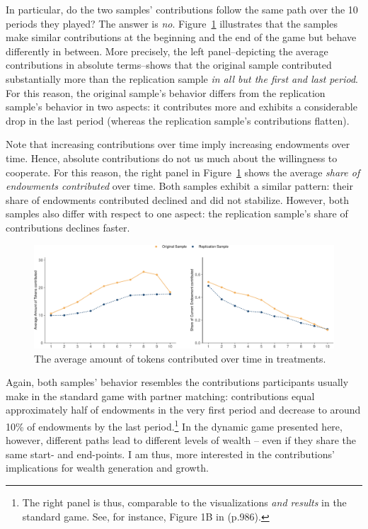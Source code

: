 \documentclass[
  authoryear,
  preprint,
  3p]{elsarticle}
\begin{document}
In particular, do the two samples' contributions follow the same path
over the 10 periods they played? The answer is \emph{no}.
Figure~\ref{fig-share-of-contributions} illustrates that the samples
make similar contributions at the beginning and the end of the game but
behave differently in between. More precisely, the left panel--depicting
the average contributions in absolute terms--shows that the original
sample contributed substantially more than the replication sample
\emph{in all but the first and last period}. For this reason, the
original sample's behavior differs from the replication sample's
behavior in two aspects: it contributes more and exhibits a considerable
drop in the last period (whereas the replication sample's contributions
flatten).

Note that increasing contributions over time imply increasing endowments
over time. Hence, absolute contributions do not us much about the
willingness to cooperate. For this reason, the right panel in
Figure~\ref{fig-share-of-contributions} shows the average \emph{share of
endowments contributed} over time. Both samples exhibit a similar
pattern: their share of endowments contributed declined and did not
stabilize. However, both samples also differ with respect to one aspect:
the replication sample's share of contributions declines faster.

\begin{figure}

{\centering \includegraphics{paper_files/figure-pdf/fig-share-of-contributions-1.pdf}

}

\caption{\label{fig-share-of-contributions}The average amount of tokens
contributed over time in treatments.}

\end{figure}

Again, both samples' behavior resembles the contributions participants
usually make in the standard game with partner matching: contributions
equal approximately half of endowments in the very first period and
decrease to around 10\% of endowments by the last period.\footnote{The
  right panel is thus, comparable to the visualizations \emph{and
  results} in the standard game. See, for instance, Figure 1B in
  \citet{fehrgaechter2000} (p.986).} In the dynamic game presented here,
however, different paths lead to different levels of wealth -- even if
they share the same start- and end-points. I am thus, more interested in
the contributions' implications for wealth generation and growth.
\end{document}

